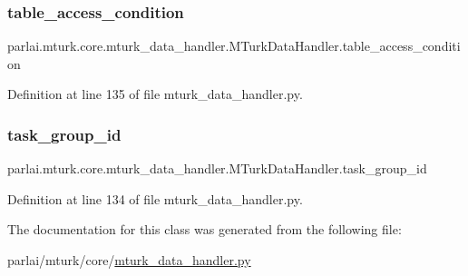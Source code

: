 \subsubsection{\texorpdfstring{table\+\_\+access\+\_\+condition}{table\_access\_condition}}
{\footnotesize\ttfamily parlai.\+mturk.\+core.\+mturk\+\_\+data\+\_\+handler.\+M\+Turk\+Data\+Handler.\+table\+\_\+access\+\_\+condition}



Definition at line 135 of file mturk\+\_\+data\+\_\+handler.\+py.

\mbox{\label{classparlai_1_1mturk_1_1core_1_1mturk__data__handler_1_1MTurkDataHandler_abef46871b0b4686b67f0b4dcea99e81c}} 
\subsubsection{\texorpdfstring{task\+\_\+group\+\_\+id}{task\_group\_id}}
{\footnotesize\ttfamily parlai.\+mturk.\+core.\+mturk\+\_\+data\+\_\+handler.\+M\+Turk\+Data\+Handler.\+task\+\_\+group\+\_\+id}



Definition at line 134 of file mturk\+\_\+data\+\_\+handler.\+py.



The documentation for this class was generated from the following file\+:\begin{DoxyCompactItemize}
\item 
parlai/mturk/core/\hyperlink{mturk__data__handler_8py}{mturk\+\_\+data\+\_\+handler.\+py}\end{DoxyCompactItemize}
